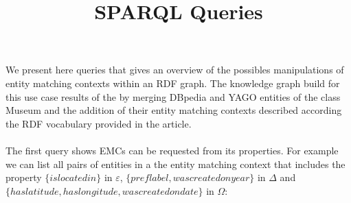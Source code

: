 \documentclass[runningheads]{llncs}
\begin{document}
%
\title{SPARQL Queries}
%
%
%
\maketitle              %
%

%
%
%

We present here queries that gives an overview of the possibles manipulations of entity matching contexts within an RDF graph. 
The knowledge graph build for this use case results of the by merging DBpedia and YAGO entities of the class Museum and the addition of their entity matching contexts described according the RDF vocabulary provided in the article.

\paragraph{}
The first query shows EMCs can be requested from its properties.
For example we can list all pairs of entities in a the entity matching context that includes the property $\{islocatedin\}$ in $\varepsilon$, $\{preflabel,wascreatedonyear\}$ in $\Delta$ and $\{haslatitude,haslongitude,wascreatedondate\}$ in $\Omega$: 
\end{document}
